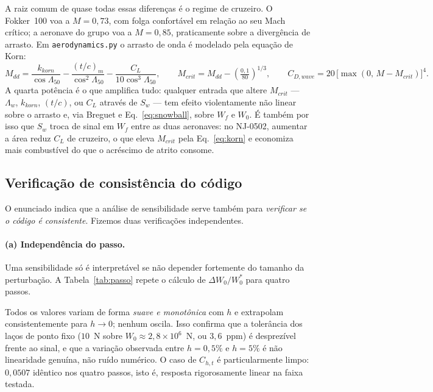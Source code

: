 \documentclass[11pt,a4paper]{article}
\newcommand{\code}[1]{\texttt{\small #1}}
\begin{document}
A raiz comum de quase todas essas diferen\c{c}as \'e o regime de cruzeiro. O
Fokker~100 voa a $M = 0{,}73$, com folga confort\'avel em rela\c{c}\~ao ao seu
Mach cr\'itico; a aeronave do grupo voa a $M = 0{,}85$, praticamente sobre a
divergência de arrasto. Em \code{aerodynamics.py} o arrasto de onda \'e
modelado pela equa\c{c}\~ao de Korn:
\begin{equation}
M_{dd} = \frac{k_{korn}}{\cos\Lambda_{50}}
       - \frac{(t/c)_m}{\cos^2\Lambda_{50}}
       - \frac{C_L}{10\cos^3\Lambda_{50}},
\qquad
M_{crit} = M_{dd} - \left(\tfrac{0{,}1}{80}\right)^{1/3},
\qquad
C_{D,wave} = 20\,\big[\max(0,\,M - M_{crit})\big]^{4}.
\label{eq:korn}
\end{equation}
A quarta pot\^encia \'e o que amplifica tudo: qualquer entrada que altere
$M_{crit}$ --- $\Lambda_w$, $k_{korn}$, $(t/c)$, ou $C_L$ atrav\'es de $S_w$
--- tem efeito violentamente n\~ao linear sobre o arrasto e, via Breguet e
Eq.~\eqref{eq:snowball}, sobre $W_f$ e $W_0$. \'E tamb\'em por isso que
$S_w$ troca de sinal em $W_f$ entre as duas aeronaves: no NJ-0502, aumentar a
\'area reduz $C_L$ de cruzeiro, o que eleva $M_{crit}$ pela
Eq.~\eqref{eq:korn} e economiza mais combust\'ivel do que o acr\'escimo de
atrito consome.

\subsection{Verifica\c{c}\~ao de consist\^encia do c\'odigo}
\label{sec:verif}

O enunciado indica que a an\'alise de sensibilidade serve tamb\'em para
\emph{verificar se o c\'odigo \'e consistente}. Fizemos duas verifica\c{c}\~oes
independentes.

\paragraph{(a) Independ\^encia do passo.}
Uma sensibilidade s\'o \'e interpret\'avel se n\~ao depender fortemente do
tamanho da perturba\c{c}\~ao. A Tabela~\ref{tab:passo} repete o c\'alculo de
$\Delta W_0/W_0^{*}$ para quatro passos.

\begin{table}[H]
\centering
\caption{Sensibilidade relativa de $W_0$ em fun\c{c}\~ao do passo da
diferen\c{c}a progressiva (aeronave NJ-0502).}
\label{tab:passo}
\small

\end{table}

Todos os valores variam de forma \emph{suave e monot\^onica} com $h$ e
extrapolam consistentemente para $h \to 0$; nenhum oscila. Isso confirma que a
toler\^ancia dos la\c{c}os de ponto fixo ($10$~N sobre $W_0 \approx
2{,}8\times10^{6}$~N, ou $3{,}6$~ppm) \'e desprez\'ivel frente ao sinal, e que
a varia\c{c}\~ao observada entre $h = 0{,}5\%$ e $h = 5\%$ \'e n\~ao
linearidade genu\'ina, n\~ao ru\'ido num\'erico. O caso de $C_{h,t}$ \'e
particularmente limpo: $0{,}0507$ id\^entico nos quatro passos, isto \'e,
resposta rigorosamente linear na faixa testada.
\end{document}
